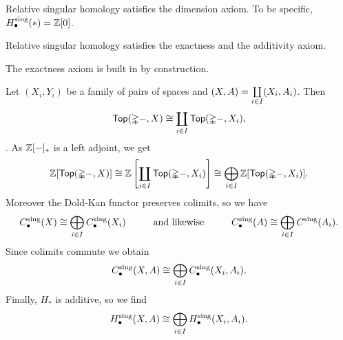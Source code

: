 	\begin{lemma}
		Relative singular homology satisfies the dimension axiom. To be specific, $H_\bullet^\text{sing}(*) = \mathbb{Z}[0]$.
	\end{lemma}

	\begin{lemma}
		Relative singular homology satisfies the exactness and the additivity axiom.
	\end{lemma}
	\begin{sketch}
		The exactness axiom is built in by construction.

		Let $(X_i,Y_i)$ be a family of pairs of spaces and $(X,A) = \coprod \limits_{i \in I}(X_i,A_i)$. Then 
		\begin{equation*}
			\textsf{Top}(\mathbb{\Delta}-,X) \cong \coprod \limits_{i \in I} \textsf{Top}(\mathbb{\Delta}-,X_i),
		\end{equation*}
		. As $\mathbb{Z}[-]_{*}$ is a left adjoint, we get 
		\begin{equation*}
			\mathbb{Z}[\textsf{Top}(\mathbb{\Delta}-,X)] \cong \mathbb{Z}\left[\coprod \limits_{i \in I} \textsf{Top}(\mathbb{\Delta}-,X_i)\right] \cong \bigoplus \limits_{i \in I} \mathbb{Z}[\textsf{Top}(\mathbb{\Delta}-,X_i)].
		\end{equation*}
		Moreover the Dold-Kan functor preserves colimits, so we have
		\begin{equation*}
			C_\bullet^\text{sing}(X) \cong \bigoplus \limits_{i \in I} C_\bullet^\text{sing}(X_i) \hspace{1cm}\text{and likewise}\hspace{1cm} C_\bullet^\text{sing}(A) \cong \bigoplus \limits_{i \in I} C^\text{sing}(A_i).
		\end{equation*}
		Since colimits commute we obtain
		\begin{equation*}
			C_\bullet^\text{sing}(X,A) \cong \bigoplus \limits_{i \in I} C_\bullet^\text{sing}(X_i,A_i).
		\end{equation*}
		Finally, $H_{*}$ is additive, so we find
		\begin{equation*}
			H_\bullet^\text{sing}(X,A) \isom \Oplus \limits_{i \in I} H_\bullet^\text{sing}(X_i,A_i).\vspace{-3em}
		\end{equation*}
	\end{sketch}

